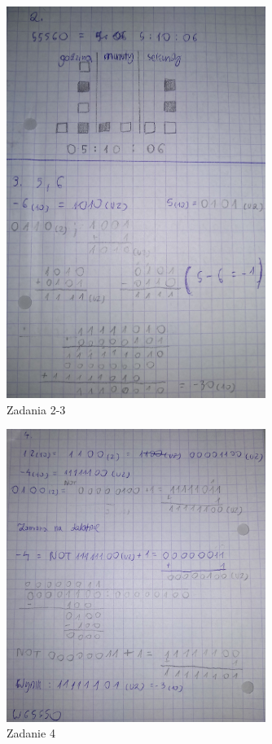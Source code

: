 \documentclass[12pt,a4paper]{article}
\begin{document}
\begin{figure}[ht]
\centering
\includegraphics[width=0.75\textwidth]{IMG_20211116_090026.jpg}
\caption{\label{fig:zad2do3}Zadania 2-3}
\end{figure}

\begin{figure}[ht]
\centering
\includegraphics[width=0.75\textwidth]{IMG_20211116_090039.jpg}
\caption{\label{fig:zad4}Zadanie 4}
\end{figure}
\end{document}
